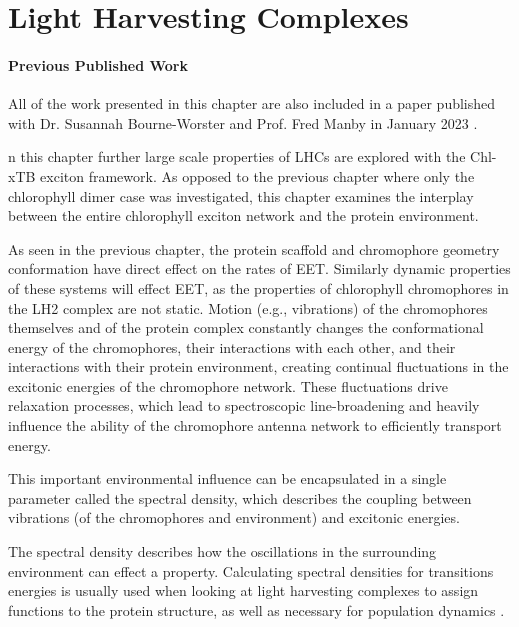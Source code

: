 %
%
\let\textcircled=\pgftextcircled
\chapter{Light Harvesting Complexes}
\label{chap:LH2}

\subsubsection*{Previous Published Work}
All of the work presented in this chapter are also included in a paper published 
with Dr. Susannah Bourne-Worster and Prof. Fred Manby in January 2023 \cite{Feighan2023}.

n this chapter further large scale properties of LHCs are explored with
the Chl-xTB exciton framework. As opposed to the previous chapter where only the 
chlorophyll dimer case was investigated, this chapter examines the interplay between
the entire chlorophyll exciton network and the protein environment.

As seen in the previous chapter, the protein scaffold and chromophore geometry conformation
have direct effect on the rates of EET. Similarly dynamic properties of these systems
will effect EET, as the properties of chlorophyll chromophores in the LH2 complex
are not static. Motion (e.g., vibrations) of the chromophores themselves and of 
the protein complex constantly changes the conformational energy of the chromophores,
their interactions with each other, and their interactions with their protein environment, 
creating continual fluctuations in the excitonic energies of the chromophore network. 
These fluctuations drive relaxation processes, which lead to spectroscopic line-broadening 
and heavily influence the ability of the chromophore antenna network to efficiently 
transport energy.

This important environmental influence can be encapsulated in a single parameter 
called the spectral density, which describes the coupling between vibrations (of 
the chromophores and environment) and excitonic energies.

The spectral density describes how the oscillations in the surrounding environment 
can effect a property. Calculating spectral densities for transitions energies is
usually used when looking at light harvesting complexes to assign functions to the 
protein structure, as well as necessary for population dynamics \cite{Mallus2018}.


